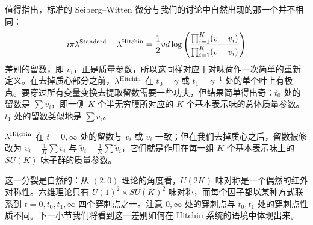 值得指出，标准的 Seiberg–Witten 微分与我们的讨论中自然出现的那一个并不相同：
\begin{equation}
\label{eq:SWstandard-vs-Hitchin}
i \pi \lambda^{\rm Standard} - \lambda^{\rm Hitchin} = \frac{1}{2} v d
\log \left( \frac{\prod_{i=1}^K (v-v_i)}{\prod_{i=1}^K (v-\tilde
v_i)} \right)
\end{equation}
差别的留数，即 $v_i$，正是质量参数，所以这同样对应于对味荷作一次简单的重新定义。在去掉质心部分之前，$\lambda^{\rm Hitchin}$ 在 $t_0= \gamma$ 或 $t_1 = \gamma^{-1}$ 处的单个叶上有极点。要穿过所有变量变换去提取留数需要一些功夫，但结果简单得出奇：$t_0$ 处的留数是 $\sum \tilde v_i$，即一侧 $K$ 个半无穷膜所对应的 $K$ 个基本表示味的总体质量参数。$t_1$ 处的留数类似地是 $\sum v_i$。

$\lambda^{\rm Hitchin}$ 在 $t=0, \infty$ 处的留数与 $v_i$ 或 $\tilde v_i$ 一致；但在我们去掉质心之后，留数被修改为 $v_i - \frac{1}{K} \sum v_i$ 与 $\tilde v_i - \frac{1}{K} \sum \tilde v_i$，它们就是作用在每一组 $K$ 个基本表示味上的 $SU(K)$ 味子群的质量参数。

这一分裂是自然的：从 $(2,0)$ 理论的角度看，$U(2K)$ 味对称是一个偶然的红外对称性。六维理论只有 $U(1)^2 \times SU(K)^2$ 味对称，而每个因子都以某种方式联系到 $t=0, t_0,t_1,\infty$ 四个穿刺点之一。注意 $0,\infty$ 处的穿刺点与 $t_0, t_1$ 处的穿刺点性质不同。下一小节我们将看到这一差别如何在 Hitchin 系统的语境中体现出来。
